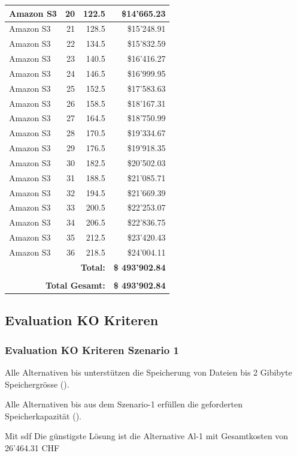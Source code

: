 \begin{table}
\begin{center}
\begin{tabular}{|l|r|r|r|}
Amazon S3 & 20 & 122.5 &  \$14'665.23  \\ \hline
Amazon S3 & 21 & 128.5 &  \$15'248.91  \\ \hline
Amazon S3 & 22 & 134.5 &  \$15'832.59  \\ \hline
Amazon S3 & 23 & 140.5 &  \$16'416.27  \\ \hline
Amazon S3 & 24 & 146.5 &  \$16'999.95  \\ \hline
Amazon S3 & 25 & 152.5 &  \$17'583.63  \\ \hline
Amazon S3 & 26 & 158.5 &  \$18'167.31  \\ \hline
Amazon S3 & 27 & 164.5 &  \$18'750.99  \\ \hline
Amazon S3 & 28 & 170.5 &  \$19'334.67  \\ \hline
Amazon S3 & 29 & 176.5 &  \$19'918.35  \\ \hline
Amazon S3 & 30 & 182.5 &  \$20'502.03  \\ \hline
Amazon S3 & 31 & 188.5 &  \$21'085.71  \\ \hline
Amazon S3 & 32 & 194.5 &  \$21'669.39  \\ \hline
Amazon S3 & 33 & 200.5 &  \$22'253.07  \\ \hline
Amazon S3 & 34 & 206.5 &  \$22'836.75  \\ \hline
Amazon S3 & 35 & 212.5 &  \$23'420.43  \\ \hline
Amazon S3 & 36 & 218.5 &  \$24'004.11  \\ \hline
\multicolumn{3}{r|}{\textbf{Total:}} & \textbf{\$ 493'902.84}
 \\ \cline{4-4}
\multicolumn{4}{c}{} \\  \cline{4-4}
\multicolumn{3}{r|}{\textbf{Total Gesamt:}} & \textbf{\$ 493'902.84}
 \\ \cline{4-4}
\end{tabular}
\end{center}
\label{tab:KostenAmazonS3S2}
\end{table}




\subsection{Evaluation KO Kriteren}
\subsubsection{Evaluation KO Kriteren Szenario 1}

Alle Alternativen  bis  unterstützen die Speicherung von Dateien bis 2 Gibibyte Speichergrösse ().

Alle Alternativen  bis  aus dem Szenario-1 erfüllen die geforderten Speicherkapazität ().

Mit sdf
Die günstigste Lösung ist die Alternative Al-1 mit Gesamtkosten von 26’464.31 CHF
